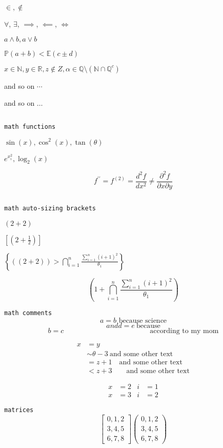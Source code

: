 \documentclass[11pt, oneside]{article}   	%
\newcommand{\bR}{\mathbb{R}} %
\newcommand{\bQ}{\mathbb{Q}} %
\newcommand{\bQc}{\mathbb{Q}^c} %
\newcommand{\bN}{\mathbb{N}} %
\newcommand{\bP}{\mathbb{P}} %
\newcommand{\bE}{\mathbb{E}} %
\newcommand{\bp}[1]{\left( #1 \right)}
\newcommand{\bb}[1]{\left[ #1 \right]}
\newcommand{\bc}[1]{\left\{ #1 \right \}}
\begin{document}
$\in, \notin$

$\forall$, $\exists$, $\implies$, $\impliedby$, $\iff$

$a \land b, a \lor b$

$\bP(a+b) < \bE(c \pm d)$

$x \in \bN, y \in \bR, z \notin Z, \alpha \in \bQ\setminus(\bN \cap \bQc)$

and so on $\cdots$

and so on $\ldots$

$\ $

\texttt{math functions}

$\sin(x), \cos^2(x), \tan(\theta)$

$e^{x_i^2}, \log_2(x)$

\[ f^{\prime\prime} = f^{(2)} = \frac{d^2 f}{dx^2} \ne \frac{\partial^2 f}{\partial x \partial y} \]

$\ $

\texttt{math auto-sizing brackets}

$\bp{2+2}$

$\bb{\bp{2+\frac{1}{2}}}$

$\bc{\bp{\bp{2 + 2}} > \bigcap_{i=1}^n \frac{\sum_{i=1}^n \bp{i +1}^2}{\theta_1}}$

\[ \bp{1 + \bigcap_{i=1}^n \frac{\sum_{i=1}^n \bp{i +1}^2}{\theta_1}} \]

\newpage

\texttt{math comments}
\[ a = b \text{ because science} \]
\[ and d = e \ \text{because} \]
\[ b = c \hspace{2in} \text{according to my mom} \]

\begin{align*}
x &= y \\
&\sim \theta - 3 \ \text{and some other text} \\
&= z + 1 \quad \text{and some other text} \\
&< z + 3 \qquad \text{and some other text}
\end{align*}

\begin{align*}
x &= 2 & i &= 1 \\
x &= 3 & i &= 2
\end{align*}

\texttt{matrices}
\[
\begin{bmatrix}
    0,1,2 \\
    3,4,5 \\
    6,7,8 
\end{bmatrix}
\begin{pmatrix}
    0,1,2 \\
    3,4,5 \\
    6,7,8
    \end{pmatrix}
\]
\end{document}
